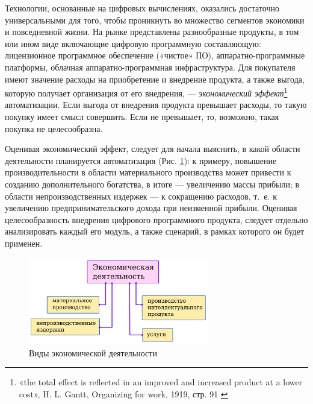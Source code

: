 \documentclass{article}
\begin{document}
Технологии, основанные на цифровых вычислениях, оказались достаточно универсальными для того, чтобы проникнуть во множество сегментов экономики и повседневной жизни. На рынке представлены разнообразные продукты, в том или ином виде включающие цифровую программную составляющую: лицензионное программное обеспечение («чистое» ПО), аппаратно-программные платформы, облачная аппаратно-программная инфраструктура. Для покупателя имеют значение расходы на приобретение и внедрение продукта, а также выгода, которую получает организация от его внедрения, — \textit{экономический эффект}\footnote{«the total effect is reflected in an improved and increased product at a lower cost», H. L. Gantt, Organizing for work, 1919, стр. 91 \cite{ecoEffectOrganizingForWork}} автоматизации. Если выгода от внедрения продукта превышает расходы, то такую покупку имеет смысл совершить. Если не превышает, то, возможно, такая покупка не целесообразна.

Оценивая экономический эффект, следует для начала выяснить, в какой области деятельности планируется автоматизация (Рис. \ref{fig:eco_acts}): к примеру, повышение производительности в области материального производства может привести к созданию дополнительного богатства, в итоге — увеличению массы прибыли; в области непроизводственных издержек — к сокращению расходов, т. е. к увеличению предпринимательского дохода при неизменной прибыли. Оценивая целесообразность внедрения цифрового программного продукта, следует отдельно анализировать каждый его модуль, а также сценарий, в рамках которого он будет применен.

\begin{figure}[h]
    \centering
    \includegraphics[width=0.70\textwidth]{eco-acts}
    \caption{Виды экономической деятельности}
    \label{fig:eco_acts}
\end{figure}

\end{document}
